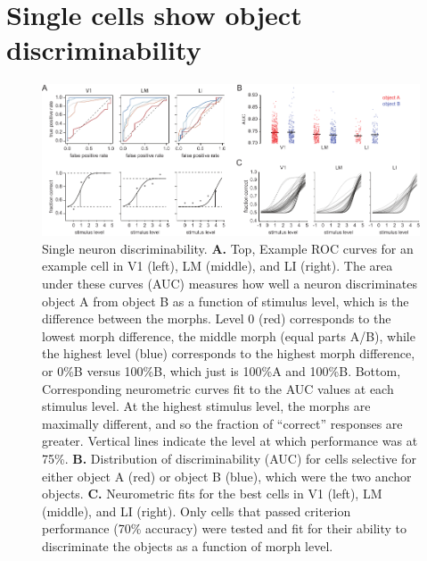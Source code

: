 \section{Single cells show object discriminability}
\begin{figure}[t!]
    \includegraphics[width=\textwidth]{figures/chapter_4/fig_4-2_neurometric/fig_4-2_neurometric.pdf}
    \caption[Single neuron discriminability]{Single neuron discriminability. 
    \textbf{A.} Top, Example ROC curves for an example cell in V1 (left), LM (middle), and LI (right). The area under these curves (AUC) measures how well a neuron discriminates object A from object B as a function of stimulus level, which is the difference between the morphs. Level 0 (red) corresponds to the lowest morph difference, the middle morph (equal parts A/B), while the highest level (blue) corresponds to the highest morph difference, or 0\%B versus 100\%B, which just is 100\%A and 100\%B. Bottom, Corresponding neurometric curves fit to the AUC values at each stimulus level. At the highest stimulus level, the morphs are maximally different, and so the fraction of ``correct'' responses are greater. Vertical lines indicate the level at which performance was at 75\%.
    \textbf{B.} Distribution of discriminability (AUC) for cells selective for either object A (red) or object B (blue), which were the two anchor objects.
    \textbf{C.} Neurometric fits for the best cells in V1 (left), LM (middle), and LI (right). Only cells that passed criterion performance (70\% accuracy) were tested and fit for their ability to discriminate the objects as a function of morph level.
    \label{fig:neurometric}}
\end{figure}

